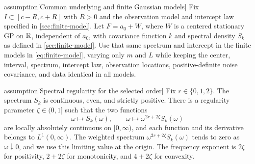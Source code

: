 \begin{theoremEnd}{assumption}[Common underlying and finite Gaussian models]
\label{ass:underlying}
Fix $I\subset[c-R,c+R]$ with $R>0$ and the observation model and
intercept law specified in \cref{sec:finite-model}. Let $F=a_0+W$, where $W$ is
a centered stationary GP on $\mathbb R$, independent of $a_0$, with covariance
function $k$ and spectral density $S_k$ as defined in
\cref{sec:finite-model}. Use that same spectrum and intercept in the finite models in
\cref{eq:finite-model}, varying only $m$ and $L$ while keeping the
center, interval, spectrum, intercept law, observation locations,
positive-definite noise covariance, and data identical in all models.
\end{theoremEnd}

\begin{theoremEnd}{assumption}[Spectral regularity for the selected order]
\label{ass:spectral}
Fix $r\in\{0,1,2\}$. The spectrum $S_k$ is continuous, even, and
strictly positive. There is a regularity parameter $\zeta\in(0,1]$
such that the two functions
\[
 \omega\longmapsto S_k(\omega),
 \qquad \omega\longmapsto\omega^{2r+2\zeta}S_k(\omega)
\]
are locally absolutely continuous on $[0,\infty)$, and each function
and its derivative belongs to $L^1(0,\infty)$.
The weighted spectrum $\omega^{2r+2\zeta}S_k(\omega)$ tends to zero
as $\omega\downarrow0$, and we use this limiting value at the origin.
The frequency exponent is
$2\zeta$ for positivity, $2+2\zeta$ for monotonicity, and
$4+2\zeta$ for convexity.
\end{theoremEnd}
